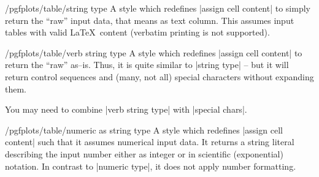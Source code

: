 \begin{stylekey}{/pgfplots/table/string type}
	A style which redefines |assign cell content| to simply return the ``raw'' input data, that means as text column. This assumes input tables with valid \LaTeX\ content (verbatim printing is not supported).
\end{stylekey}

\begin{stylekey}{/pgfplots/table/verb string type}
	A style which redefines |assign cell content| to return the ``raw'' as--is. Thus, it is quite similar to |string type| -- but it will return control sequences and (many, not all) special characters without expanding them.

	You may need to combine |verb string type| with |special chars|.
\end{stylekey}

\begin{stylekey}{/pgfplots/table/numeric as string type}
	A style which redefines |assign cell content| such that it assumes numerical input data. It returns a string literal describing the input number either as integer or in scientific (exponential) notation. In contrast to |numeric type|, it does not apply number formatting.
\end{stylekey}

